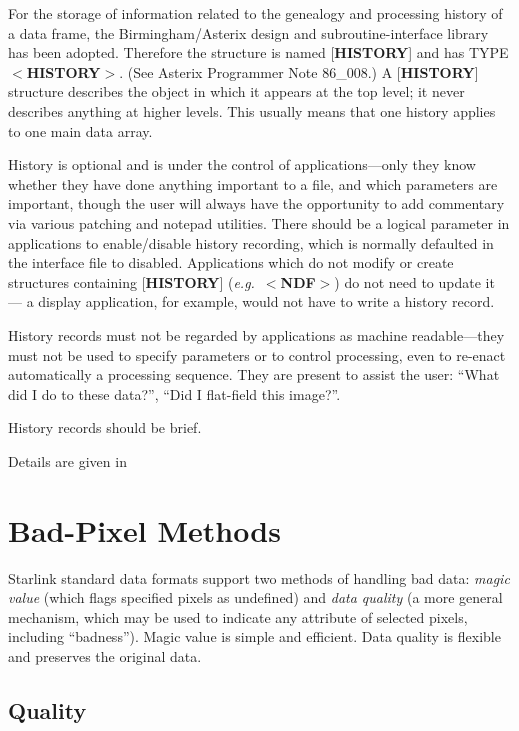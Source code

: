 For the storage of information related to the genealogy and
processing history of a data frame, the
Birmingham/Asterix design and subroutine-interface library
has been adopted.  Therefore the structure is named
{[}{\bf HISTORY}{]} and has TYPE $<${\bf HISTORY}$>$.  (See
Asterix Programmer Note 86\_008.)
A {[}{\bf HISTORY}{]} structure describes
the object in which it appears at the top level;
it never describes anything at higher levels.
This usually means that one history applies to one
main data array.

History is optional and is under the control of applications---only
they know whether they have done anything important to a file, and which
parameters are important, though the user will always
have the opportunity to add commentary via various patching
and notepad utilities.  There
should be a logical parameter in applications to enable/disable history
recording, which is normally defaulted in the interface file to
disabled.  Applications which do not modify or create structures containing
{[}{\bf HISTORY}{]} ({\it e.g.}\ 
$<${\bf NDF}$>$) do not need to update it ---
a display
application, for example, would not have to write a history
record.

History records must not be regarded by applications as
machine readable---they must not be used to specify parameters
or to control processing, even to re-enact automatically
a processing sequence.  They are present to assist the user:
``What did I do to these data?'', ``Did I flat-field this image?''.

History records should be brief.

Details are given in 

\section{Bad-Pixel Methods\label{se:badpixel}}

Starlink standard data formats support two
methods of handling bad data: {\it magic value} (which
flags specified pixels as undefined)
and {\it data quality} (a more general mechanism, which may
be used to indicate any attribute of selected pixels, including
``badness'').  Magic value is simple
and efficient.  Data quality
is flexible and preserves the original data.

\subsection{Quality\label{se:quality}}

